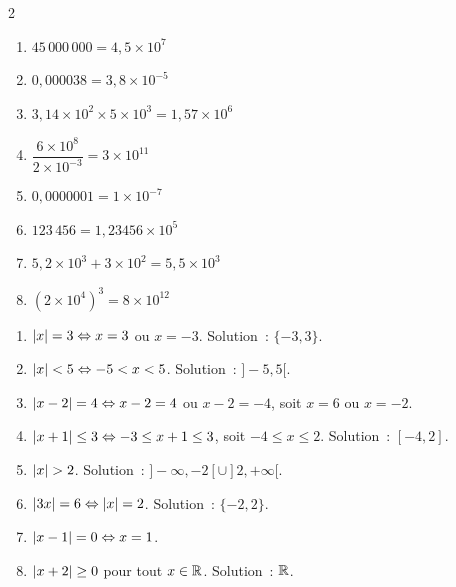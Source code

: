 
\begin{multicols}{2}
\begin{enumerate}
  \item $45\,000\,000=4{,}5\times10^7$
  \item $0{,}000038=3{,}8\times10^{-5}$
  \item $3{,}14\times10^2\times5\times10^3=1{,}57\times10^6$
  \item $\dfrac{6\times10^8}{2\times10^{-3}}=3\times10^{11}$
  \item $0{,}0000001=1\times10^{-7}$
  \item $123\,456=1{,}23456\times10^5$
  \item $5{,}2\times10^3+3\times10^2=5{,}5\times10^3$
  \item $(2\times10^4)^3=8\times10^{12}$
\end{enumerate}
\end{multicols}


\begin{enumerate}
  \item $\left|x\right|=3 \Leftrightarrow x=3$ ou $x=-3$. Solution~: $\{-3,3\}$.
  \item $\left|x\right|<5 \Leftrightarrow -5<x<5$. Solution~: $]-5,5[$.
  \item $\left|x-2\right|=4 \Leftrightarrow x-2=4$ ou $x-2=-4$, soit $x=6$ ou $x=-2$.
  \item $\left|x+1\right|\leq3 \Leftrightarrow -3\leq x+1\leq3$,
        soit $-4\leq x\leq2$. Solution~: $[-4,2]$.
  \item $\abs{x}>2$. Solution~: $]-\infty,-2[\cup]2,+\infty[$.
  \item $\left|3x\right|=6\Leftrightarrow\left|x\right|=2$. Solution~: $\{-2,2\}$.
  \item $\left|x-1\right|=0\Leftrightarrow x=1$.
  \item $\left|x+2\right|\geq0$ pour tout $x\in\mathbb{R}$. Solution~: $\mathbb{R}$.
\end{enumerate}


